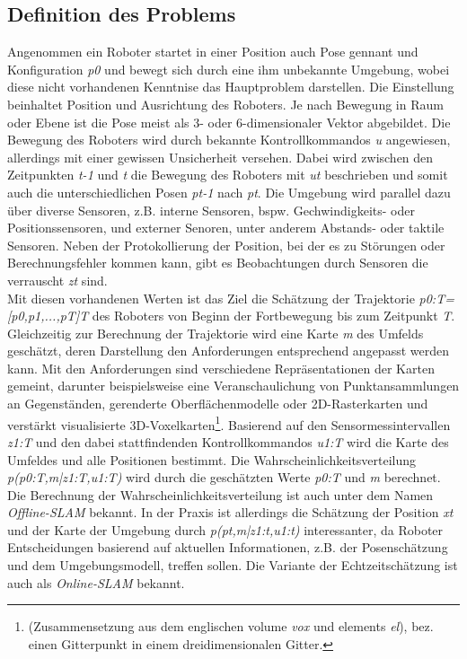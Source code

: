 \subsection{Definition des Problems}
Angenommen ein Roboter startet in einer Position auch Pose gennant und Konfiguration \textit{p0} und bewegt sich durch eine ihm 
unbekannte Umgebung, wobei diese nicht vorhandenen Kenntnise das Hauptproblem darstellen. Die Einstellung beinhaltet Position und Ausrichtung 
des Roboters. Je nach Bewegung in Raum oder Ebene ist die Pose meist als 3- oder 6-dimensionaler Vektor abgebildet. Die Bewegung des 
Roboters wird durch bekannte Kontrollkommandos \textit{u} angewiesen, allerdings mit einer gewissen Unsicherheit versehen. Dabei wird 
zwischen den Zeitpunkten \textit{t-1} und \textit{t} die Bewegung des Roboters mit \textit{ut} beschrieben und somit auch die 
unterschiedlichen Posen \textit{pt-1} nach \textit{pt}. Die Umgebung wird parallel dazu über diverse Sensoren, z.B. interne Sensoren, bspw. 
Gechwindigkeits- oder Positionssensoren, und externer Senoren, unter anderem Abstands- oder taktile Sensoren. Neben der Protokollierung der 
Position, bei der es zu Störungen oder Berechnungsfehler kommen kann, gibt es Beobachtungen durch Sensoren die verrauscht \textit{zt} sind.
\\ 
\linebreak
Mit diesen vorhandenen Werten ist das Ziel die Schätzung der Trajektorie \textit{p0:T=[p0,p1,...,pT]T} des Roboters von Beginn der 
Fortbewegung bis zum Zeitpunkt \textit{T}. Gleichzeitig zur Berechnung der Trajektorie wird eine Karte \textit{m} des Umfelds geschätzt, 
deren Darstellung den Anforderungen entsprechend angepasst werden kann. Mit den Anforderungen sind verschiedene Repräsentationen der Karten 
gemeint, darunter beispielsweise eine Veranschaulichung von Punktansammlungen an Gegenständen, gerenderte Oberflächenmodelle oder 
2D-Rasterkarten und verstärkt visualisierte 3D-Voxelkarten\footnote{(Zusammensetzung aus dem englischen volume \textit{vox} und elements 
\textit{el}), bez. einen Gitterpunkt in einem dreidimensionalen Gitter.}. Basierend auf den Sensormessintervallen \textit{z1:T} und den dabei
stattfindenden Kontrollkommandos \textit{u1:T} wird die Karte des Umfeldes und alle Positionen bestimmt. Die Wahrscheinlichkeitsverteilung 
\textit{p(p0:T,m|z1:T,u1:T)} wird durch die geschätzten Werte \textit{p0:T} und \textit{m} berechnet. 
\\ 
\linebreak
Die Berechnung der Wahrscheinlichkeitsverteilung ist auch unter dem Namen \textit{Offline-\acs{SLAM}} bekannt. In der Praxis ist allerdings 
die Schätzung der Position \textit{xt} und der Karte der Umgebung durch \textit{p(pt,m|z1:t,u1:t)} interessanter, da Roboter Entscheidungen 
basierend auf aktuellen Informationen, z.B. der Posenschätzung und dem Umgebungsmodell, treffen sollen. Die Variante der Echtzeitschätzung 
ist auch als \textit{Online-SLAM} bekannt. \cite{slamdefi.2016a}

